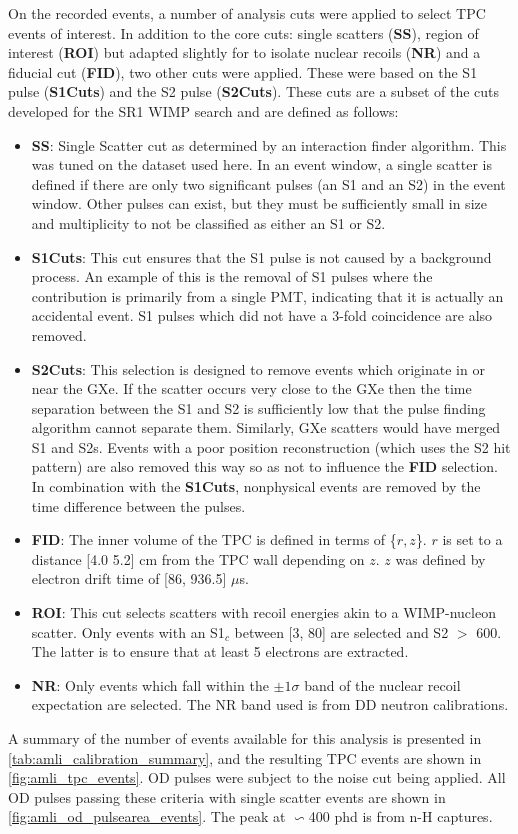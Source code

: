 \par
On the recorded events, a number of analysis cuts were applied to select TPC events of interest.
In addition to the core cuts: single scatters (\textbf{SS}), region of interest (\textbf{ROI}) but adapted slightly for to isolate nuclear recoils (\textbf{NR}) and a fiducial cut (\textbf{FID}), two other cuts were applied.
These were based on the S1 pulse (\textbf{S1Cuts}) and the S2 pulse (\textbf{S2Cuts}).
These cuts are a subset of the cuts developed for the SR1 WIMP search \cite{lz_ws_sr1_ref} and are defined as follows:
\begin{itemize}
    \item \textbf{SS}: Single Scatter cut as determined by an interaction finder algorithm. This was tuned on the dataset used here. In an event window, a single scatter is defined if there are only two significant pulses (an S1 and an S2) in the event window. Other pulses can exist, but they must be sufficiently small in size and multiplicity to not be classified as either an S1 or S2.
    \item \textbf{S1Cuts}: This cut ensures that the S1 pulse is not caused by a background process. An example of this is the removal of S1 pulses where the contribution is primarily from a single PMT, indicating that it is actually an accidental event. S1 pulses which did not have a 3-fold coincidence are also removed.
    \item \textbf{S2Cuts}: This selection is designed to remove events which originate in or near the GXe. If the scatter occurs very close to the GXe then the time separation between the S1 and S2 is sufficiently low that the pulse finding algorithm cannot separate them. Similarly, GXe scatters would have merged S1 and S2s. Events with a poor position reconstruction (which uses the S2 hit pattern) are also removed this way so as not to influence the \textbf{FID} selection. In combination with the \textbf{S1Cuts}, nonphysical events are removed by the time difference between the pulses.
    \item \textbf{FID}: The inner volume of the TPC is defined in terms of \{$r,z$\}. $r$ is set to a distance [4.0 5.2] cm from the TPC wall depending on $z$. $z$ was defined by electron drift time of [86, 936.5] $\mu$s.
    \item \textbf{ROI}: This cut selects scatters with recoil energies akin to a WIMP-nucleon scatter. Only events with an S1$_c$ between [3, 80] are selected and S2 $>$ 600. The latter is to ensure that at least 5 electrons are extracted.
    \item \textbf{NR}: Only events which fall within the $\pm 1\sigma$ band of the nuclear recoil expectation are selected. The NR band used is from DD neutron calibrations.
\end{itemize}
A summary of the number of events available for this analysis is presented in \autoref{tab:amli_calibration_summary}, and the resulting TPC events are shown in \autoref{fig:amli_tpc_events}.
OD pulses were subject to the noise cut being applied.
All OD pulses passing these criteria with single scatter events are shown in \autoref{fig:amli_od_pulsearea_events}.
The peak at $\backsim$400 phd is from n-H captures.

